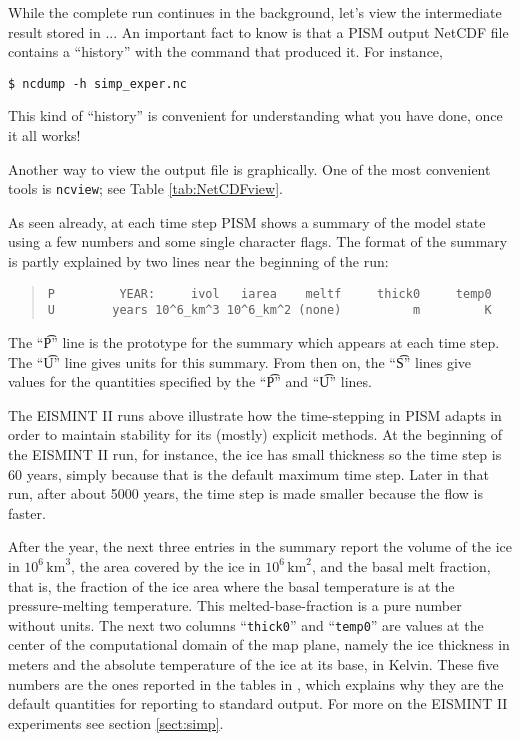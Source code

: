 While the complete run continues in the background, let's view the intermediate result stored in ...  An important fact to know is that a PISM output NetCDF file contains a ``history'' with the command that produced it.  For instance, 

\verb|$ ncdump -h simp_exper.nc|

\noindent This kind of ``history'' is convenient for understanding what you have done, once it all works!


Another way to view the output file is graphically.  One of the most convenient tools is \verb|ncview|; see Table \ref{tab:NetCDFview}.



As seen already, at each time step PISM shows a summary of the model state using a few numbers and some single character flags.  The format of the summary is partly explained by two lines near the beginning of the run:

\small\begin{quote}
\begin{verbatim}
P         YEAR:     ivol   iarea    meltf     thick0     temp0
U        years 10^6_km^3 10^6_km^2 (none)          m         K
\end{verbatim}
\end{quote}\normalsize

The ``\t{P}'' line is the prototype for the summary which appears at each time step.  The ``\t{U}'' line gives units for this summary.  From then on, the ``\t{S}'' lines give values for the quantities specified by the  ``\t{P}'' and ``\t{U}'' lines.

The EISMINT II runs above illustrate how the time-stepping in PISM adapts in order to maintain stability for its (mostly) explicit methods.  At the beginning of the EISMINT II run, for instance, the ice has small thickness so the time step is 60 years, simply because that is the default maximum time step.  Later in that run, after about 5000 years, the time step is made smaller because the flow is faster.

After the year, the next three entries in the summary report the volume of the ice in $10^6 \,\text{km}^3$, the area covered by the ice in $10^6\,\text{km}^2$, and the basal melt fraction, that is, the fraction of the ice area where the basal temperature is at the pressure-melting temperature.  This melted-base-fraction is a pure number without units.  The next two columns ``\texttt{thick0}'' and ``\texttt{temp0}'' are values at the center of the computational domain of the map plane, namely the ice thickness in meters and the absolute temperature of the ice at its base, in Kelvin.  These five numbers are the ones reported in the tables in \cite{EISMINT00}, which explains why they are the default quantities for reporting to standard output.  For more on the EISMINT II experiments see section \ref{sect:simp}.



